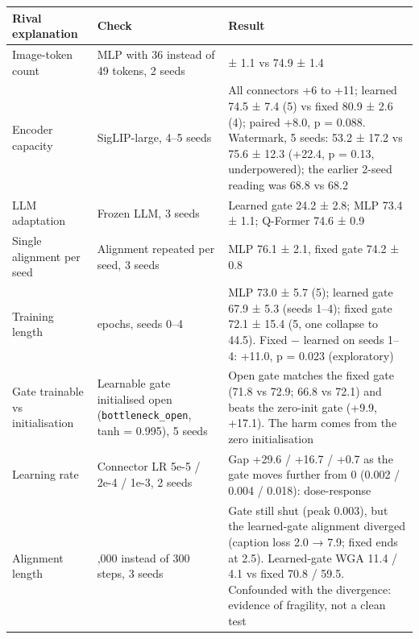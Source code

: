 {\def\LTcaptype{none} %
\begin{longtable}[]{@{}
  >{\raggedright\arraybackslash}p{}
  >{\raggedright\arraybackslash}p{}
  >{\raggedright\arraybackslash}p{}@{}}
\toprule\noalign{}
\begin{minipage}[b]{\linewidth}\raggedright
Rival explanation
\end{minipage} & \begin{minipage}[b]{\linewidth}\raggedright
Check
\end{minipage} & \begin{minipage}[b]{\linewidth}\raggedright
Result
\end{minipage} \\
\midrule\noalign{}
\endhead
\bottomrule\noalign{}
\endlastfoot
Image-token count & MLP with 36 instead of 49 tokens, 2 seeds & 74.7 ± 1.1 vs 74.9 ± 1.4 \\
Encoder capacity & SigLIP-large, 4--5 seeds & All connectors +6 to +11; learned 74.5 ± 7.4 (5) vs fixed 80.9 ± 2.6 (4); paired +8.0, p = 0.088. Watermark, 5 seeds: 53.2 ± 17.2 vs 75.6 ± 12.3 (+22.4, p = 0.13, underpowered); the earlier 2-seed reading was 68.8 vs 68.2 \\
LLM adaptation & Frozen LLM, 3 seeds & Learned gate 24.2 ± 2.8; MLP 73.4 ± 1.1; Q-Former 74.6 ± 0.9 \\
Single alignment per seed & Alignment repeated per seed, 3 seeds & MLP 76.1 ± 2.1, fixed gate 74.2 ± 0.8 \\
Training length & 8 epochs, seeds 0--4 & MLP 73.0 ± 5.7 (5); learned gate 67.9 ± 5.3 (seeds 1--4); fixed gate 72.1 ± 15.4 (5, one collapse to 44.5). Fixed − learned on seeds 1--4: +11.0, p = 0.023 (exploratory) \\
Gate trainable vs initialisation & Learnable gate initialised open (\texttt{bottleneck\_open}, tanh = 0.995), 5 seeds & Open gate matches the fixed gate (71.8 vs 72.9; 66.8 vs 72.1) and beats the zero-init gate (+9.9, +17.1). The harm comes from the zero initialisation \\
Learning rate & Connector LR 5e-5 / 2e-4 / 1e-3, 2 seeds & Gap +29.6 / +16.7 / +0.7 as the gate moves further from 0 (0.002 / 0.004 / 0.018): dose-response \\
Alignment length & 3,000 instead of 300 steps, 3 seeds & Gate still shut (peak 0.003), but the learned-gate alignment diverged (caption loss 2.0 → 7.9; fixed ends at 2.5). Learned-gate WGA 11.4 / 4.1 vs fixed 70.8 / 59.5. Confounded with the divergence: evidence of fragility, not a clean test \\

\end{longtable}}
